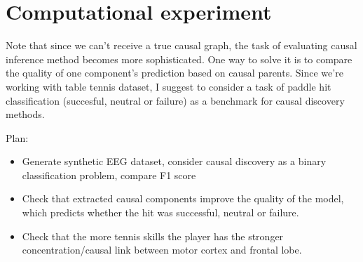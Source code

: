 \documentclass[14pt]{extarticle}
\begin{document}
%		
%		
%			
%			
%			
%			
%			
%			


	\section{Computational experiment}
	Note that since we can't receive a true causal graph, the task of evaluating causal inference method becomes more sophisticated.
	One way to solve it is to compare the quality of one component's prediction based on causal parents.
	Since we're working with table tennis dataset, I suggest to consider a task of paddle hit classification (succesful, neutral or failure) as a benchmark for causal discovery methods.
	
	Plan:
	\begin{itemize}
		\item Generate synthetic EEG dataset, consider causal discovery as a binary classification problem, compare F1 score
		\item Check that extracted causal components improve the quality of the model, which predicts whether the hit was successful, neutral or failure.
		\item Check that the more tennis skills the player has the stronger concentration/causal link between motor cortex and frontal lobe.
	\end{itemize}
	
\end{document}
